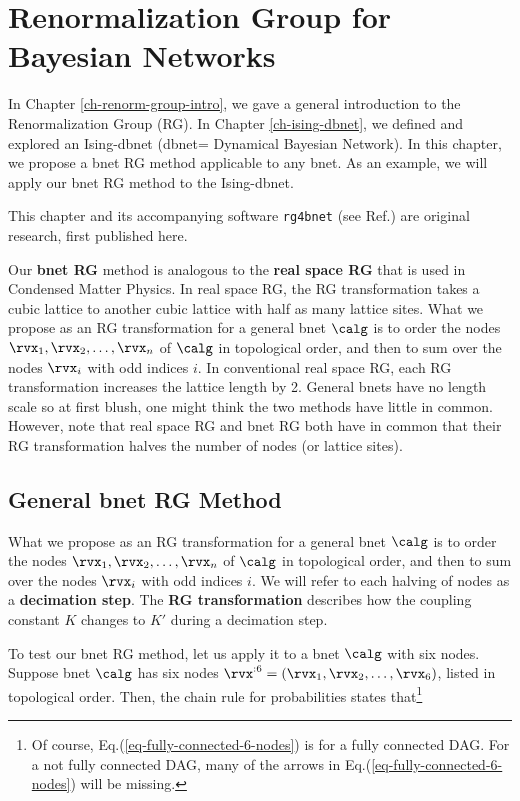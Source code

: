
\chapter{Renormalization Group for
Bayesian Networks}
\label{ch-renorm-group-bnets}

In Chapter \ref{ch-renorm-group-intro},
we gave a general introduction to the
Renormalization Group (RG).
In Chapter \ref{ch-ising-dbnet},
we defined and explored an Ising-dbnet (dbnet= Dynamical
Bayesian Network).
In this chapter,
we propose a bnet RG method
applicable to
any bnet.
As an example,
we will
apply our bnet RG method
to the Ising-dbnet.

This chapter and its accompanying software 
{\tt rg4bnet} (see Ref.\cite{rg4bnets}) are original research, first published here.


Our {\bf bnet RG} method  is analogous
to the {\bf real space RG} that  is
used in Condensed Matter Physics. In real space RG,
the RG transformation
takes a cubic lattice
to another cubic lattice
with half as many lattice sites.
What we propose as an RG transformation
for a general bnet $\calg$
is to order the nodes $\rvx_1, \rvx_2, \ldots,\rvx_n$
of $\calg$ in topological order, and 
then to sum over the nodes $\rvx_i$
with odd
indices  $i$.
In conventional real space
RG, each RG transformation
increases the lattice length
by 2. General
bnets have no length scale
so at first blush, one might think the two methods have little in common.
However, note that real space
RG and bnet RG
both have in common that
their RG transformation
halves the number of nodes (or
lattice sites).

\section{General bnet RG Method}

What we propose as an RG transformation
for a general bnet $\calg$
is to order the nodes $\rvx_1, \rvx_2, \ldots,\rvx_n$
of $\calg$ in topological order, and 
then to sum over the nodes $\rvx_i$
with odd indices $i$.
We will refer to each
halving of nodes as a 
{\bf  decimation step}.
The {\bf RG transformation}
describes how the coupling
constant $K$ changes to $K'$
during a decimation step.


To test our bnet RG method, let us apply it to
a bnet $\calg$
with six nodes. 
Suppose bnet $\calg$
has six nodes $\rvx^{:6}=
(\rvx_1, \rvx_2, \ldots, \rvx_6)$,
listed in topological
order. Then, the chain
rule for probabilities 
states that\footnote{
Of course, Eq.(\ref{eq-fully-connected-6-nodes}) is for
a
fully connected DAG.
For a not fully connected DAG, 
many of the arrows 
in Eq.(\ref{eq-fully-connected-6-nodes})
will be missing.}





